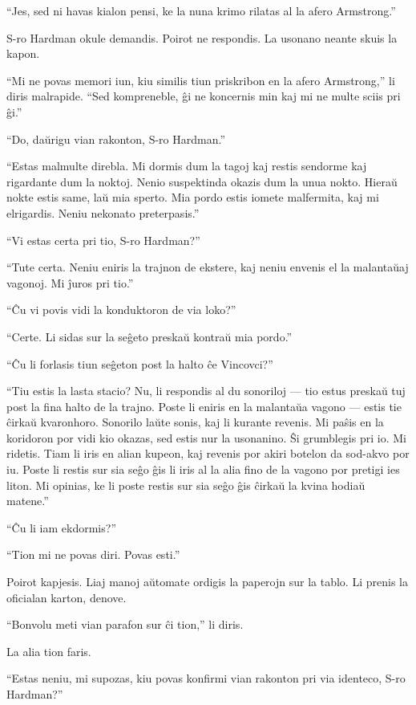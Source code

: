 ``Jes, sed ni havas kialon pensi, ke la nuna krimo rilatas al la afero Armstrong.''

S-ro Hardman okule demandis. Poirot ne respondis. La usonano neante skuis la kapon.

``Mi ne povas memori iun, kiu similis tiun priskribon en la afero Armstrong,'' li diris malrapide. ``Sed kompreneble, ĝi ne koncernis min kaj mi ne multe sciis pri ĝi.''

``Do, daŭrigu vian rakonton, S-ro Hardman.''

``Estas malmulte direbla. Mi dormis dum la tagoj kaj restis sendorme kaj rigardante dum la noktoj. Nenio suspektinda okazis dum la unua nokto. Hieraŭ nokte estis same, laŭ mia sperto. Mia pordo estis iomete malfermita, kaj mi elrigardis. Neniu nekonato preterpasis.''

``Vi estas certa pri tio, S-ro Hardman?''

``Tute certa. Neniu eniris la trajnon de ekstere, kaj neniu envenis el la malantaŭaj vagonoj. Mi ĵuros pri tio.''

``Ĉu vi povis vidi la konduktoron de via loko?''

``Certe. Li sidas sur la seĝeto preskaŭ kontraŭ mia pordo.''

``Ĉu li forlasis tiun seĝeton post la halto ĉe Vincovci?''

``Tiu estis la lasta stacio? Nu, li respondis al du sonoriloj --- tio estus preskaŭ tuj post la fina halto de la trajno. Poste li eniris en la malantaŭa vagono --- estis tie ĉirkaŭ kvaronhoro. Sonorilo laŭte sonis, kaj li kurante revenis. Mi paŝis en la koridoron por vidi kio okazas, sed estis nur la usonanino. Ŝi grumblegis pri io. Mi ridetis. Tiam li iris en alian kupeon, kaj revenis por akiri botelon da sod-akvo por iu. Poste li restis sur sia seĝo ĝis li iris al la alia fino de la vagono por pretigi ies liton. Mi opinias, ke li poste restis sur sia seĝo ĝis ĉirkaŭ la kvina hodiaŭ matene.''

``Ĉu li iam ekdormis?''

``Tion mi ne povas diri. Povas esti.''

Poirot kapjesis. Liaj manoj aŭtomate ordigis la paperojn sur la tablo. Li prenis la oficialan karton, denove.

``Bonvolu meti vian parafon sur ĉi tion,'' li diris.

La alia tion faris.

``Estas neniu, mi supozas, kiu povas konfirmi vian rakonton pri via identeco, S-ro Hardman?''

